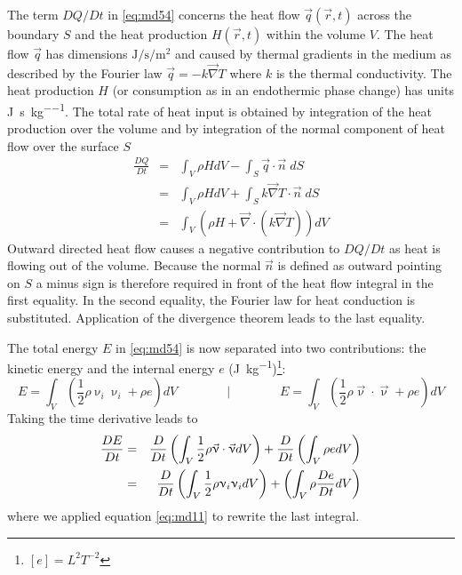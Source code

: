 The term $DQ/Dt$ in \eqref{eq:md54} concerns the heat flow $\vec{q}(\vec{r},t)$
across the boundary $S$ and the heat production $H(\vec{r},t)$
within the volume $V$. The heat flow $\vec{q}$ has dimensions 
$\si{\joule\per\second\per\square\meter}$
and caused by thermal gradients in the medium as described by the Fourier law
$\vec{q}=-k \vec\nabla T$ where $k$ is the thermal conductivity. 
The heat production $H$ (or consumption as in an endothermic phase change) has units 
\si{\joule\per\second\per\kg}.
The total rate of heat input is
obtained by integration of the heat production over the volume and by integration of the
normal component of heat flow over the surface $S$
\begin{eqnarray}
\frac{DQ}{Dt} 
&=& \int_V \rho H dV - \int_S \vec{q} \cdot \vec{n} \; dS \\
&=& \int_V \rho H dV + \int_S k \vec\nabla T  \cdot \vec{n} \; dS \\
&=& \int_V \left(  \rho H + \vec\nabla \cdot (  k \vec\nabla T )  \right) dV 
\label{eq:md58}
\end{eqnarray}
Outward directed heat flow causes a negative contribution to $DQ/Dt$ 
as heat is flowing out of
the volume. Because the normal $\vec{n}$ is defined as outward pointing on $S$ a minus sign is
therefore required in front of the heat flow integral in the first equality. In the second
equality, the Fourier law for heat conduction is substituted. Application of the divergence
theorem leads to the last equality.

The total energy $E$ in \eqref{eq:md54} is now separated into 
two contributions: the kinetic energy and
the internal energy $e$ (\si{\joule\per\kg})\footnote{$[e]=L^2T^{-2}$}:
\begin{equation}
E = \int_V (\frac{1}{2} \rho \upnu_i \upnu_i + \rho e)dV
\qquad
\qquad
\bigg\rvert
\qquad
\qquad
E = \int_V (\frac{1}{2} \rho \vec\upnu\cdot \vec\upnu + \rho e)dV
\label{eq:md59}
\end{equation}
Taking the time derivative leads to
\begin{eqnarray}
\frac{DE}{Dt} 
&=& \frac{D}{Dt} \left( \int_V \frac12 \rho \vec\upnu\cdot\vec\upnu dV   \right)
+ \frac{D}{Dt} \left( \int_V \rho e dV  \right) \nonumber\\
&=& \frac{D}{Dt} \left( \int_V \frac12 \rho \upnu_i \upnu_i dV   \right)
+ \left( \int_V \rho \frac{De}{Dt} dV  \right) 
\label{eq:md60}
\end{eqnarray}
where we applied equation \eqref{eq:md11} to rewrite the last integral.

